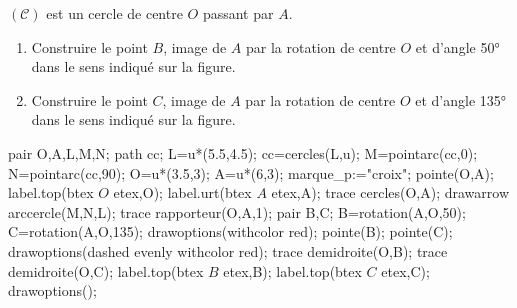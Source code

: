 \begin{corrige}
    $(\mathcal{C})$ est un cercle de centre $O$ passant par $A$.

    \begin{enumerate}
        \item Construire le point $B$, image de $A$ par la rotation de centre $O$ et d'angle \ang{50} dans le sens indiqué sur la figure.
        \item Construire le point $C$, image de $A$ par la rotation de centre $O$ et d'angle \ang{135} dans le sens indiqué sur la figure.
    \end{enumerate}
    \begin{center}
        \begin{Geometrie}[CoinHD={(7u,6u)}]
            pair O,A,L,M,N;
            path cc;
            L=u*(5.5,4.5);
            cc=cercles(L,u);
            M=pointarc(cc,0);
            N=pointarc(cc,90);
            O=u*(3.5,3);
            A=u*(6,3);
            marque_p:="croix";
            pointe(O,A);
            label.top(btex $O$ etex,O);
            label.urt(btex $A$ etex,A);
            trace cercles(O,A);
            drawarrow arccercle(M,N,L);
            trace rapporteur(O,A,1);
            pair B,C;
            B=rotation(A,O,50);        
            C=rotation(A,O,135);
            drawoptions(withcolor red);
            pointe(B);
            pointe(C);
            drawoptions(dashed evenly withcolor red);
            trace demidroite(O,B);
            trace demidroite(O,C);
            label.top(btex $B$ etex,B);
            label.top(btex $C$ etex,C);
            drawoptions();
        \end{Geometrie}
    \end{center}
\end{corrige}

